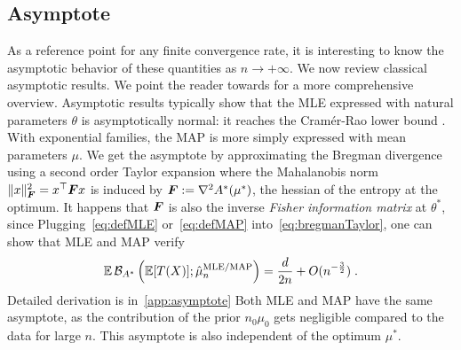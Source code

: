 \documentclass[twoside]{article}
\newcommand{\logpart}{A}
\newcommand{\conj}{\logpart^*}
\newcommand{\bregmanconj}{\cB_{\logpart^*}}
\newcommand{\nat}{\theta}
\newcommand{\m}{\mu}
\newcommand{\meanp}{\m}
\begin{document}
\subsection{Asymptote}
\label{ssec:asymptote}
As a reference point for any finite convergence rate, it is interesting to know the asymptotic behavior of these quantities as $n \rightarrow +\infty$.
We now review classical asymptotic results.
We point the reader towards \citet[\S1.1]{ostrovskii2021finite} for a more comprehensive overview.
Asymptotic results typically show that the MLE expressed with natural parameters $\nat$ is asymptotically normal: it reaches the Cramér-Rao lower bound \citep[for instance Ch4.2]{vdv1998asymptotic}.
With exponential families, the MAP is more simply expressed with mean parameters $\meanp$.
We get the asymptote by approximating the Bregman divergence using a second order Taylor expansion
\alignn{
    \bregmanconj(\m^* ; \m)
    &= \frac{\norm{\m^* - \m}^2_{\mF}}{2}
    + O(\norm{\m - \m^*}^3),
    \label{eq:bregmanTaylor}
}
where the Mahalanobis norm  $\| x \|_{{\bm{F}}}^2 = x^\top {\bm{F}} x$  is induced by $\mF  := \nabla^2\conj(\m^*)$, the hessian of the entropy at the optimum. It happens that  ${\bm{F}}$ is also the inverse \textit{Fisher information matrix} at $\nat^*$, since
\aligns{
    \mF
    :=\nabla^2\conj(\m^*)
    = \nabla^2\logpart(\nat^*)^{-1}
    = \Cov_{\nat^*}[T(X)]^{-1}  \; .
}
Plugging~\eqref{eq:defMLE} or~\eqref{eq:defMAP} into~\eqref{eq:bregmanTaylor}, one can show that MLE and MAP verify
\begin{align}
	\label{eq:asymptote}
	\E \bregmanconj \left (\E [T(X)] ; \hat \meanp_n^\text{MLE/MAP} \right )
	= \frac{d}{2n} + O(n^{- \frac{3}{2}}) \; .
\end{align}
Detailed derivation is in~\cref{app:asymptote}
Both MLE and MAP have the same asymptote, as the contribution of the prior $n_0 \meanp_0$ gets negligible compared to the data for large $n$.
This asymptote is also independent of the optimum $\meanp^*$.
\end{document}
